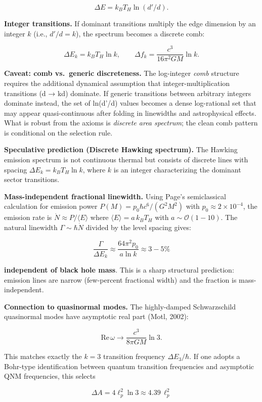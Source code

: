 \documentclass[
]{article}
\begin{document}
\[
\Delta E = k_B T_H \ln(d'/d).
\]

\textbf{Integer transitions.} If dominant transitions multiply the edge
dimension by an integer \(k\) (i.e., \(d'/d = k\)), the spectrum becomes
a discrete comb:

\[
\Delta E_k = k_B T_H \ln k, \qquad
\Delta f_k = \frac{c^3}{16\pi^2 G M} \ln k.
\]

\textbf{Caveat: comb vs.~generic discreteness.} The log-integer
\emph{comb} structure requires the additional dynamical assumption that
integer-multiplication transitions (d → kd) dominate. If generic
transitions between arbitrary integers dominate instead, the set of
ln(d'/d) values becomes a dense log-rational set that may appear
quasi-continuous after folding in linewidths and astrophysical effects.
What is robust from the axioms is \emph{discrete area spectrum}; the
clean comb pattern is conditional on the selection rule.

\textbf{Speculative prediction (Discrete Hawking spectrum).} The Hawking
emission spectrum is not continuous thermal but consists of discrete
lines with spacing \(\Delta E_k = k_B T_H \ln k\), where \(k\) is an
integer characterizing the dominant sector transitions.

\textbf{Mass-independent fractional linewidth.} Using Page's
semiclassical calculation for emission power
\(P(M) = p_0 \hbar c^6 / (G^2 M^2)\) with
\(p_0 \approx 2 \times 10^{-4}\), the emission rate is
\(\dot{N} \approx P /
\langle E \rangle\) where \(\langle E \rangle = a \, k_B T_H\) with
\(a \sim
\mathcal{O}(1-10)\). The natural linewidth \(\Gamma \sim \hbar \dot{N}\)
divided by the level spacing gives:

\[
\frac{\Gamma}{\Delta E_k} \approx \frac{64\pi^2 p_0}{a \ln k} \approx 3-5\%
\]

\textbf{independent of black hole mass}. This is a sharp structural
prediction: emission lines are narrow (few-percent fractional width) and
the fraction is mass-independent.

\textbf{Connection to quasinormal modes.} The highly-damped
Schwarzschild quasinormal modes have asymptotic real part (Motl, 2002):

\[
\mathrm{Re}\,\omega \to \frac{c^3}{8\pi G M} \ln 3.
\]

This matches exactly the \(k = 3\) transition frequency
\(\Delta E_3 / \hbar\). If one adopts a Bohr-type identification between
quantum transition frequencies and asymptotic QNM frequencies, this
selects

\[
\Delta A = 4\ell_p^2 \ln 3 \approx 4.39 \, \ell_p^2
\]
\end{document}
